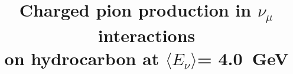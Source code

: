 \documentclass[aps,prl,preprint,showpacs,superscriptaddress,nofootinbib,floatfix,linenumbers]{revtex4}
\begin{document}
\ifnum{}
\linenumbers
\fi
\title{Charged pion production in $\nu_\mu$ interactions \\
on hydrocarbon at $\langle E_{\nu}\rangle$= 4.0~GeV} 




\newcommand{\deceased}{Deceased}

\newcommand{\wroclaw}{Institute of Theoretical Physics, Wroc\l aw University, Wroc\l aw, Poland}    

\end{document}
